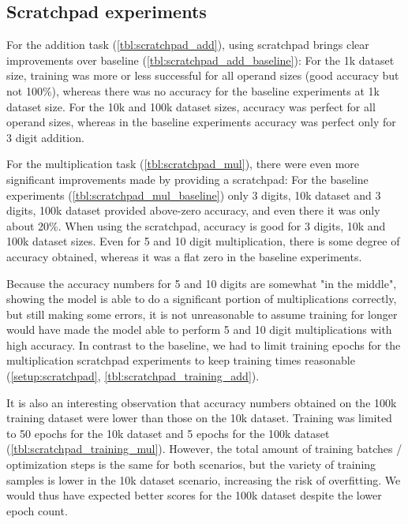 \FloatBarrier
\subsection{Scratchpad experiments}
\label{results:scratchpad}


For the addition task (\cref{tbl:scratchpad_add}), using scratchpad brings clear improvements over baseline (\cref{tbl:scratchpad_add_baseline}): For the 1k dataset size, training was more or less successful for all operand sizes (good accuracy but not 100\%), whereas there was no accuracy for the baseline experiments at 1k dataset size.
For the 10k and 100k dataset sizes, accuracy was perfect for all operand sizes, whereas in the baseline experiments accuracy was perfect only for 3 digit addition.

For the multiplication task (\cref{tbl:scratchpad_mul}), there were even more significant improvements made by providing a scratchpad: For the baseline experiments (\cref{tbl:scratchpad_mul_baseline}) only 3 digits, 10k dataset and 3 digits, 100k dataset provided above-zero accuracy, and even there it was only about 20\%. When using the scratchpad, accuracy is good for 3 digits, 10k and 100k dataset sizes.
Even for 5 and 10 digit multiplication, there is some degree of accuracy obtained, whereas it was a flat zero in the baseline experiments.

Because the accuracy numbers for 5 and 10 digits are somewhat "in the middle", showing the model is able to do a significant portion of multiplications correctly, but still making some errors, it is not unreasonable to assume training for longer would have made the model able to perform 5 and 10 digit multiplications with high accuracy. In contrast to the baseline, we had to limit training epochs for the multiplication scratchpad experiments to keep training times reasonable (\cref{setup:scratchpad}, \cref{tbl:scratchpad_training_add}).

It is also an interesting observation that accuracy numbers obtained on the 100k training dataset were lower than those on the 10k dataset. Training was limited to 50 epochs for the 10k dataset and 5 epochs for the 100k dataset (\cref{tbl:scratchpad_training_mul}). However, the total amount of training batches / optimization steps is the same for both scenarios, but the variety of training samples is lower in the 10k dataset scenario, increasing the risk of overfitting.
We would thus have expected better scores for the 100k dataset despite the lower epoch count.

